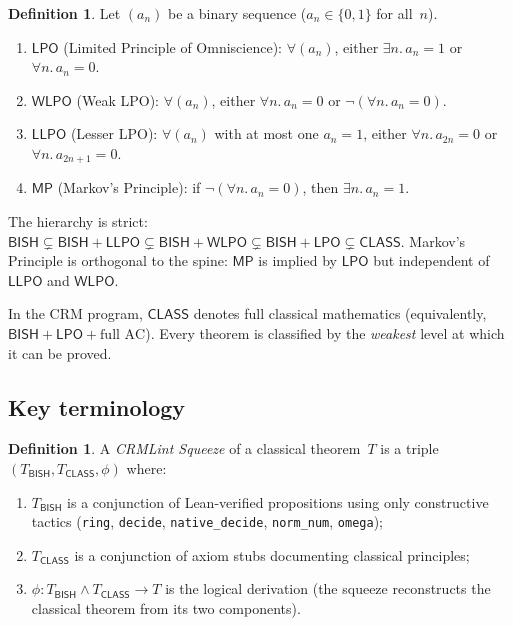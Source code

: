 \documentclass[11pt]{article}
\theoremstyle{plain}
\theoremstyle{definition}
\newtheorem{definition}[theorem]{Definition}
\theoremstyle{remark}
\newcommand{\BISH}{\mathsf{BISH}}
\newcommand{\LPO}{\mathsf{LPO}}
\newcommand{\WLPO}{\mathsf{WLPO}}
\newcommand{\LLPO}{\mathsf{LLPO}}
\newcommand{\MP}{\mathsf{MP}}
\newcommand{\CLASS}{\mathsf{CLASS}}
\begin{document}
\begin{definition}
Let $(a_n)$ be a binary sequence ($a_n \in \{0,1\}$ for all~$n$).
\begin{enumerate}[label=(\roman*),nosep]
\item $\LPO$ (Limited Principle of Omniscience): $\forall (a_n)$,
  either $\exists n.\, a_n = 1$ or $\forall n.\, a_n = 0$.
\item $\WLPO$ (Weak LPO): $\forall (a_n)$,
  either $\forall n.\, a_n = 0$ or $\lnot(\forall n.\, a_n = 0)$.
\item $\LLPO$ (Lesser LPO): $\forall (a_n)$ with at most one
  $a_n = 1$, either $\forall n.\, a_{2n} = 0$ or
  $\forall n.\, a_{2n+1} = 0$.
\item $\MP$ (Markov's Principle): if $\lnot(\forall n.\, a_n = 0)$,
  then $\exists n.\, a_n = 1$.
\end{enumerate}
\end{definition}

The hierarchy is strict:
$\BISH \subsetneq \BISH + \LLPO \subsetneq \BISH + \WLPO
\subsetneq \BISH + \LPO \subsetneq \CLASS$.
Markov's Principle is orthogonal to the spine: $\MP$ is implied by
$\LPO$ but independent of $\LLPO$ and $\WLPO$.

In the CRM program, $\CLASS$ denotes full classical mathematics
(equivalently, $\BISH + \LPO + \text{full AC}$).  Every theorem
is classified by the \emph{weakest} level at which it can be proved.

\subsection{Key terminology}

\begin{definition}
A \emph{CRMLint Squeeze} of a classical theorem~$T$ is a triple
$(T_{\BISH}, T_{\CLASS}, \phi)$ where:
\begin{enumerate}[label=(\roman*),nosep]
\item $T_{\BISH}$ is a conjunction of Lean-verified propositions
  using only constructive tactics (\texttt{ring}, \texttt{decide},
  \texttt{native\_decide}, \texttt{norm\_num}, \texttt{omega});
\item $T_{\CLASS}$ is a conjunction of axiom stubs documenting
  classical principles;
\item $\phi: T_{\BISH} \wedge T_{\CLASS} \to T$ is the logical
  derivation (the squeeze reconstructs the classical theorem
  from its two components).
\end{enumerate}
\end{definition}
\end{document}
